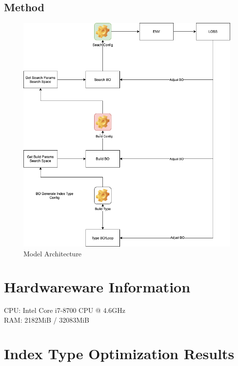 \hypertarget{method}{%
\subsection{Method}\label{method}}

\begin{figure}
\centering
\includegraphics{./figures/flow.png}
\caption{Model Architecture}
\end{figure}

\hypertarget{hardwareware-information}{%
\section{Hardwareware Information}\label{hardwareware-information}}

CPU: Intel Core i7-8700 CPU @ 4.6GHz\\
RAM: 2182MiB / 32083MiB

\hypertarget{index-type-optimization-results}{%
\section{Index Type Optimization
Results}\label{index-type-optimization-results}}

\hypertarget{section}{%
\subsection{}\label{section}}

